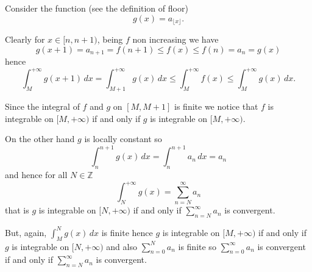 \documentclass[12pt]{article}
\begin{document}
Consider the function (see the definition of floor)
\[
  g(x)=a_{\lfloor x\rfloor}.
\]

Clearly for $x\in [n,n+1)$, being $f$ non increasing we have 
\[
  g(x+1) = a_{n+1} = f(n+1) \le f(x) \le f(n) = a_n = g(x)
\]
hence
\[
   \int_{M}^{+\infty} g(x+1)\, dx =
   \int_{M+1}^{+\infty} g(x)\, dx \le \int_M^{+\infty} f(x) 
   \le \int_M^{+\infty} g(x)\, dx.
\]

Since the integral of $f$ and $g$ on $[M,M+1]$ is finite we notice that $f$ is integrable on $[M,+\infty)$ if and only if $g$ is integrable on $[M,+\infty)$.

On the other hand $g$ is locally constant so
\[
  \int_n^{n+1} g(x)\, dx = \int_n^{n+1} a_n\, dx = a_n
\]
and hence for all $N\in \mathbb Z$ 
\[
  \int_N^{+\infty} g(x) = \sum_{n=N}^\infty a_n
\]
that is $g$ is integrable on $[N,+\infty)$ if and only if $\sum_{n=N}^\infty a_n$ is convergent.

But, again, $\int_M^N g(x)\, dx$ is finite hence $g$ is integrable on $[M,+\infty)$ if and only if $g$ is integrable on $[N,+\infty)$ and also $\sum_{n=0}^N a_n$ is finite so $\sum_{n=0}^\infty a_n$ is convergent if and only if $\sum_{n=N}^\infty a_n$ is convergent.
\end{document}
